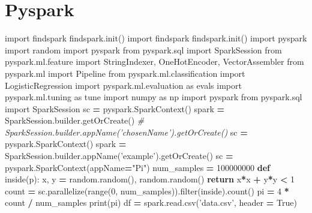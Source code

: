 \documentclass[]{book}
\newenvironment{Shaded}{\begin{snugshade}}{\end{snugshade}}
\newcommand{\BuiltInTok}[1]{#1}
\newcommand{\CommentTok}[1]{\textcolor[rgb]{0.56,0.35,0.01}{\textit{#1}}}
\newcommand{\ControlFlowTok}[1]{\textcolor[rgb]{0.13,0.29,0.53}{\textbf{#1}}}
\newcommand{\DecValTok}[1]{\textcolor[rgb]{0.00,0.00,0.81}{#1}}
\newcommand{\ImportTok}[1]{#1}
\newcommand{\KeywordTok}[1]{\textcolor[rgb]{0.13,0.29,0.53}{\textbf{#1}}}
\newcommand{\NormalTok}[1]{#1}
\newcommand{\OperatorTok}[1]{\textcolor[rgb]{0.81,0.36,0.00}{\textbf{#1}}}
\newcommand{\StringTok}[1]{\textcolor[rgb]{0.31,0.60,0.02}{#1}}
\newcommand{\VariableTok}[1]{\textcolor[rgb]{0.00,0.00,0.00}{#1}}
\begin{document}
\hypertarget{pyspark-1}{%
\section{Pyspark}\label{pyspark-1}}

\begin{Shaded}
\begin{Highlighting}[]
\ImportTok{import}\NormalTok{ findspark}
\NormalTok{findspark.init()}
\ImportTok{import}\NormalTok{ findspark}
\NormalTok{findspark.init()}
\ImportTok{import}\NormalTok{ pyspark}
\ImportTok{import}\NormalTok{ random}
\ImportTok{import}\NormalTok{ pyspark}
\ImportTok{from}\NormalTok{ pyspark.sql }\ImportTok{import}\NormalTok{ SparkSession}
\ImportTok{from}\NormalTok{ pyspark.ml.feature }\ImportTok{import}\NormalTok{ StringIndexer, OneHotEncoder, VectorAssembler}
\ImportTok{from}\NormalTok{ pyspark.ml }\ImportTok{import}\NormalTok{ Pipeline}
\ImportTok{from}\NormalTok{ pyspark.ml.classification }\ImportTok{import}\NormalTok{ LogisticRegression}
\ImportTok{import}\NormalTok{ pyspark.ml.evaluation }\ImportTok{as}\NormalTok{ evals}
\ImportTok{import}\NormalTok{ pyspark.ml.tuning }\ImportTok{as}\NormalTok{ tune}
\ImportTok{import}\NormalTok{ numpy }\ImportTok{as}\NormalTok{ np}
\ImportTok{import}\NormalTok{ pyspark}
\ImportTok{from}\NormalTok{ pyspark.sql }\ImportTok{import}\NormalTok{ SparkSession}
\NormalTok{sc }\OperatorTok{=}\NormalTok{ pyspark.SparkContext()}
\NormalTok{spark }\OperatorTok{=}\NormalTok{ SparkSession.builder.getOrCreate() }\CommentTok{# SparkSession.builder.appName('chosenName').getOrCreate()}
\NormalTok{sc }\OperatorTok{=}\NormalTok{ pyspark.SparkContext()}
\NormalTok{spark }\OperatorTok{=}\NormalTok{ SparkSession.builder.appName(}\StringTok{'example'}\NormalTok{).getOrCreate()}
\NormalTok{sc }\OperatorTok{=}\NormalTok{ pyspark.SparkContext(appName}\OperatorTok{=}\StringTok{"Pi"}\NormalTok{)}
\NormalTok{num_samples }\OperatorTok{=} \DecValTok{100000000}
\KeywordTok{def}\NormalTok{ inside(p):     }
\NormalTok{    x, y }\OperatorTok{=}\NormalTok{ random.random(), random.random()}
    \ControlFlowTok{return}\NormalTok{ x}\OperatorTok{*}\NormalTok{x }\OperatorTok{+}\NormalTok{ y}\OperatorTok{*}\NormalTok{y }\OperatorTok{<} \DecValTok{1}
\NormalTok{count }\OperatorTok{=}\NormalTok{ sc.parallelize(}\BuiltInTok{range}\NormalTok{(}\DecValTok{0}\NormalTok{, num_samples)).}\BuiltInTok{filter}\NormalTok{(inside).count()}
\NormalTok{pi }\OperatorTok{=} \DecValTok{4} \OperatorTok{*}\NormalTok{ count }\OperatorTok{/}\NormalTok{ num_samples}
\BuiltInTok{print}\NormalTok{(pi)}
\NormalTok{df }\OperatorTok{=}\NormalTok{ spark.read.csv(}\StringTok{'data.csv'}\NormalTok{, header }\OperatorTok{=} \VariableTok{True}\NormalTok{)}

\end{Highlighting}
\end{Shaded}
\end{document}
